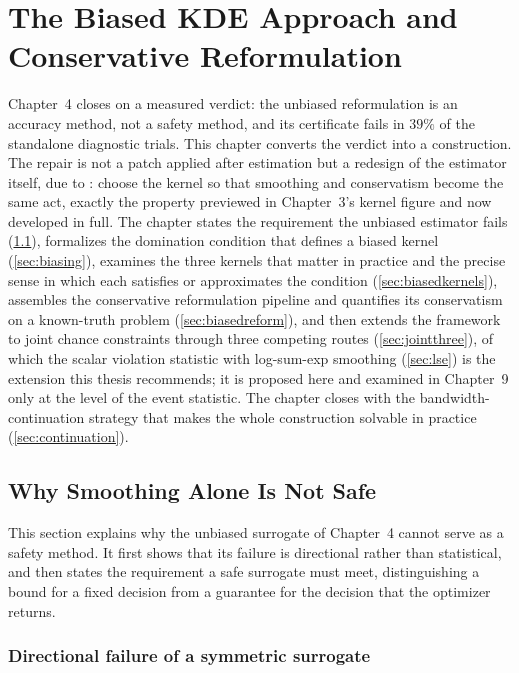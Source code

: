 \section[The Biased KDE Approach and Conservative Reformulation]{The Biased KDE Approach and\\Conservative Reformulation}
\label{ch:biasedkde}

Chapter~4 closes on a measured verdict: the unbiased reformulation is an
accuracy method, not a safety method, and its certificate fails in $39\%$ of
the standalone diagnostic trials. This chapter converts the verdict into a
construction.
The repair is not a patch applied after estimation but a redesign of the
estimator itself, due to \citet{keil2020,keil2021}: choose the kernel so
that smoothing and conservatism become the same act, exactly the
property previewed in Chapter~3's kernel figure and now developed in
full. The chapter states the requirement the unbiased estimator fails
(\cref{sec:notsafe}), formalizes the domination condition that defines a
biased kernel (\cref{sec:biasing}), examines the three kernels that
matter in practice and the precise sense in which each satisfies or
approximates the condition (\cref{sec:biasedkernels}), assembles the
conservative reformulation pipeline and quantifies its conservatism on a
known-truth problem (\cref{sec:biasedreform}), and then extends the
framework to joint chance constraints through three competing routes
(\cref{sec:jointthree}), of which the scalar violation statistic with
log-sum-exp smoothing (\cref{sec:lse}) is the extension this thesis
recommends; it is proposed here and examined in Chapter~9 only at the
level of the event statistic. The chapter
closes with the bandwidth-continuation strategy that makes the whole
construction solvable in practice (\cref{sec:continuation}).

\subsection{Why Smoothing Alone Is Not Safe}
\label{sec:notsafe}

This section explains why the unbiased surrogate of Chapter~4 cannot
serve as a safety method. It first shows that its failure is directional
rather than statistical, and then states the requirement a safe surrogate
must meet, distinguishing a bound for a fixed decision from a guarantee
for the decision that the optimizer returns.

\subsubsection{Directional failure of a symmetric surrogate}
\label{sec:directionalfailure}

